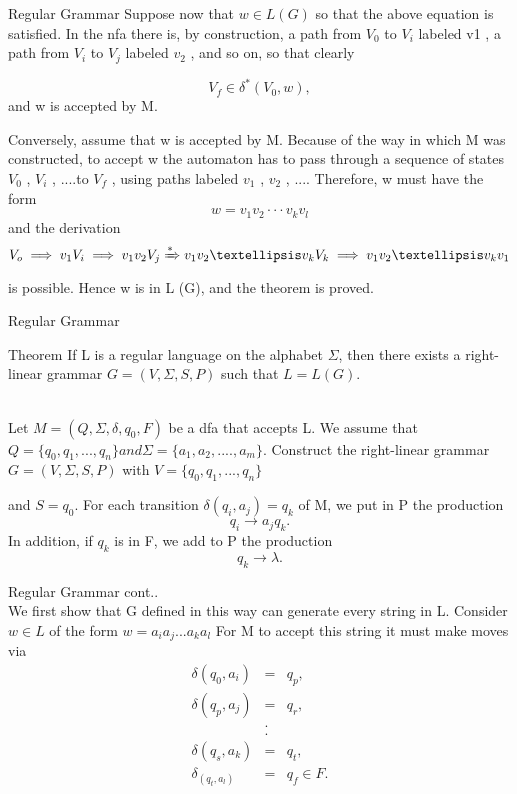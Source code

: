 \documentclass{beamer}
\begin{document}
\begin{frame}{Regular Grammar}
Suppose now that $w \in L(G)$ so that the above equation is satisfied. In the nfa there
is, by construction, a path from $V_0$
to $V_i$
labeled v1
, a path from $V_i$
to $V_j$
labeled $v_2$
, and so on, so that clearly

$$V_f \in \delta^* (V_0, w),$$
and w is accepted by M.
\par Conversely, assume that w is accepted by M. Because of the way in
which M was constructed, to accept w the automaton has to pass through
a sequence of states $V_0$
, $V_i$
, ....to $V_f$
, using paths labeled $v_1$
, $v_2$
, ....
Therefore, w must have the form
$$w = v_1v_2 ··· v_kv_l$$
and the derivation
$$V_o \implies v_1V_i \implies v_1v_2V_j
\xRightarrow{*} v_1v_2…v_kV_k \implies v_1v_2…v_kv_1$$
is possible. Hence w is in L (G), and the theorem is proved.
\end{frame}		
\begin{frame}{Regular Grammar}
\begin{block}{Theorem}
	If L is a regular language on the alphabet $\Sigma$, then there exists a right-linear
grammar $G = (V, \Sigma, S, P)$ such that $L = L (G)$.

\end{block}
	\proofname \\
	Let $M = (Q, \Sigma, \delta, q_0
	, F)$ be a dfa that accepts L. We assume that$ Q = \{q_0	, q_1,..., q_n\} and \Sigma = \{a_1, a_2,...., a_m\}$. Construct the right-linear grammar $G = (V, \Sigma, S, P)$ with $V = \{q_0, q_1	,..., q_n\}$

	and $S = q_0$. For each transition $\delta(q_i, a_j	) = q_k$
	of M, we put in P the production
	$$q_i \rightarrow a_jq_k.$$
	In addition, if $q_k$
	is in F, we add to P the production
	$$q_k \rightarrow \lambda.$$
	
\end{frame}			
\begin{frame}{Regular Grammar}
	\proofname cont.. \\
	\small
	We first show that G defined in this way can generate every string in L.
	Consider $w \in L$ of the form $w = a_ia_j... a_ka_l$
	For M to accept this string it must make moves via
	\begin{eqnarray*}
		\delta(q_0,a_i) &=& q_p,\\
		\delta(q_p,a_j) &=& q_r,\\
			&.&\\
		&.&\\
			\delta(q_s,a_k)&=& q_t,\\
			\delta_(q_t,a_l)&=&q_f \in F.\\
	\end{eqnarray*}
\end{frame}	
\end{document}

